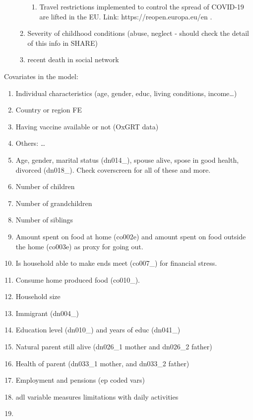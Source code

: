 \documentclass{article}
\begin{document}
\begin{enumerate}
\begin{enumerate}
\begin{enumerate}
                    \item Travel restrictions implemented to control the spread of COVID-19 are lifted in the EU. \newline Link: https://reopen.europa.eu/en . 
                \end{enumerate}
            \item Severity of childhood conditions (abuse, neglect - should check the detail of this info in SHARE)
            \item recent death in social network
        \end{enumerate}
\end{enumerate}
Covariates in the model: 
\begin{enumerate}
    \item Individual characteristics (age, gender, educ, living conditions, income\dots)
    \item Country or region FE
    \item Having vaccine available or not (OxGRT data)
    \item Others: \dots
    \item Age, gender, marital status (dn014\_), spouse alive, spose in good health, divorced (dn018\_). Check coverscreen for all of these and more.
    \item Number of children
    \item Number of grandchildren
    \item Number of siblings
    \item Amount spent on food at home (co002e) and amount spent on food outside the home (co003e) as proxy for going out.
    \item Is household able to make ends meet (co007\_) for financial stress.
    \item Consume home produced food (co010\_).
    \item Household size
    \item Immigrant (dn004\_)
    \item Education level (dn010\_) and years of educ (dn041\_)
    \item Natural parent still alive (dn026\_1 mother and dn026\_2 father)
    \item Health of parent (dn033\_1 mother, and dn033\_2 father)
    \item Employment and pensions (ep coded vars)
    \item adl variable measures limitations with daily activities
    \item 
\end{enumerate}
\end{document}
